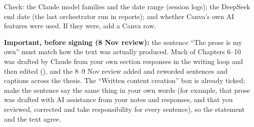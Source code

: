 \begin{instructions}
Check: the Claude model families and the date range (session logs); the DeepSeek end date (the last orchestrator run in
 reports); and whether Canva's own AI features were used. If they were, add a Canva row.

\textbf{Important, before signing (8 Nov review):} the sentence ``The prose is my own'' must match how the text was
actually produced. Much of Chapters 6--10 was drafted by Claude from your own section responses in the writing loop and
then edited (), and the 8--9 Nov review added and reworded sentences and
captions across the thesis. The ``Written content creation'' box is already ticked; make the sentence say the same
thing in your own words (for example, that prose was drafted with AI assistance from your notes and responses, and
that you reviewed, corrected and take responsibility for every sentence), so the statement and the text agree.
\end{instructions}
